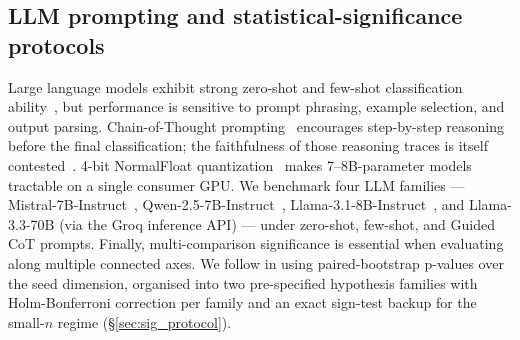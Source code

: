 \subsection{LLM prompting and statistical-significance protocols}

Large language models exhibit strong zero-shot and few-shot classification ability~\citep{brown2020language}, but performance is sensitive to prompt phrasing, example selection, and output parsing. Chain-of-Thought prompting~\citep{wei2022chain} encourages step-by-step reasoning before the final classification; the faithfulness of those reasoning traces is itself contested~\citep{turpin2023language}. 4-bit NormalFloat quantization~\citep{dettmers2022gptint} makes 7--8B-parameter models tractable on a single consumer GPU. We benchmark four LLM families --- Mistral-7B-Instruct~\citep{jiang2023mistral}, Qwen-2.5-7B-Instruct~\citep{qwen25}, Llama-3.1-8B-Instruct~\citep{llama31}, and Llama-3.3-70B (via the Groq inference API) --- under zero-shot, few-shot, and Guided CoT prompts. Finally, multi-comparison significance is essential when evaluating along multiple connected axes. We follow \citet{dror2018hitchhikers} in using paired-bootstrap p-values over the seed dimension, organised into two pre-specified hypothesis families with Holm-Bonferroni correction per family and an exact sign-test backup for the small-$n$ regime (\S\ref{sec:sig_protocol}).

